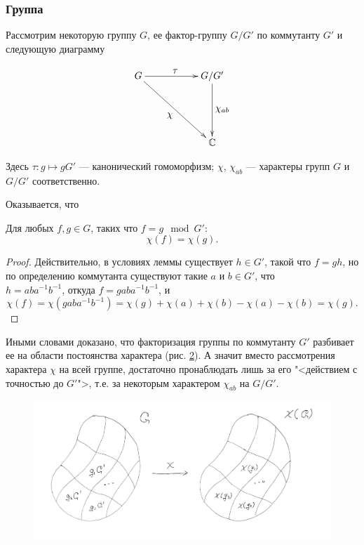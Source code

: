 \subsubsection{Группа}
    Рассмотрим некоторую группу $G$, ее фактор-группу $G/G'$ по коммутанту 
    $G'$ и следующую диаграмму

    \begin{figure}[h]
        \centering
        \[\xymatrix{
            G \ar[rr]^{\textstyle{\tau}} \ar[rrdd]_{\textstyle{\chi}} & & G/G'\ar[dd]^{\textstyle{\chi_{ab}}} \\
            & & \\
            & & \mathbb{C}
        }\]
        \caption{}
        \label{cd_ab}
    \end{figure}

    Здесь $\tau: g \mapsto gG'$ --- канонический гомоморфизм; $\chi$, 
    $\chi_{ab}$ --- характеры групп $G$ и $G/G'$ соответственно.

    Оказывается, что 

    \begin{lemma}\label{lm_const} Для любых $f, g \in G$, таких что $f = g \mod G'$:
        \[\chi(f) = \chi(g).\]
    \end{lemma}

    \begin{proof} Действительно, в условиях леммы существует $h \in G'$, 
        такой что $f = gh$, но по определению коммутанта существуют такие 
        $a$ и $b \in G'$, что \\$h = aba^{-1}b^{-1}$, откуда $f = gaba^{-1}b^{-1}$, и 
        \[\chi(f) = \chi(gaba^{-1}b^{-1}) 
        = \chi(g) + \chi(a) + \chi(b) - \chi(a) - \chi(b) = \chi(g).\]
    \end{proof}

    Иными словами доказано, что факторизация 
    группы по коммутанту $G'$ разбивает ее на области постоянства
    характера (рис. \ref{img_chi_factor}). А значит вместо 
    рассмотрения характера $\chi$ на всей группе, достаточно пронаблюдать 
    лишь за его "<действием с точностью до $G'$">, т.е. за некоторым характером
    $\chi_{ab}$ на $G/G'$.

    \begin{figure}[h]
        \centering
        \includegraphics[width=\textwidth]{pictures/chips}
        \caption{}
        \label{img_chi_factor}
    \end{figure}

